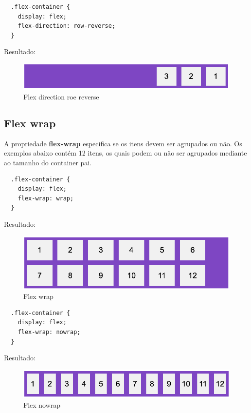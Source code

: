 \begin{lstlisting}
  .flex-container {
    display: flex;
    flex-direction: row-reverse;
  } 
\end{lstlisting}

Resultado: 

\begin{figure}[H]
  \centering
  \includegraphics[scale=0.4]{imagens/flex-direction-row-reverse.png}
  \caption{Flex direction roe reverse}
  \label{fig:model-flexbox}
\end{figure}

\subsection{Flex wrap}

A propriedade \textbf{flex-wrap} especifica se os itens devem ser agrupados ou não. Os exemplos abaixo contém 12 itens, os quais podem ou não ser agrupados mediante ao tamanho do container pai.

\begin{lstlisting}
  .flex-container {
    display: flex;
    flex-wrap: wrap;
  } 
\end{lstlisting}

Resultado: 

\begin{figure}[H]
  \centering
  \includegraphics[scale=0.4]{imagens/flex-wrap.png}
  \caption{Flex wrap}
  \label{fig:model-flexbox}
\end{figure}

\begin{lstlisting}
  .flex-container {
    display: flex;
    flex-wrap: nowrap;
  } 
\end{lstlisting}

Resultado: 

\begin{figure}[H]
  \centering
  \includegraphics[scale=0.4]{imagens/flex-nowrap.png}
  \caption{Flex nowrap}
  \label{fig:model-flexbox}
\end{figure}


